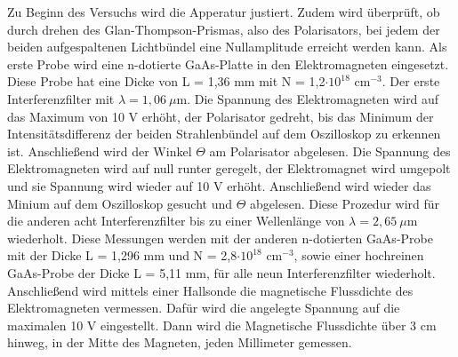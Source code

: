 Zu Beginn des Versuchs wird die Apperatur justiert. Zudem wird überprüft, ob durch drehen des Glan-Thompson-Prismas, 
also des Polarisators, bei jedem der beiden aufgespaltenen Lichtbündel eine Nullamplitude erreicht werden kann. 
Als erste Probe wird eine n-dotierte GaAs-Platte in den Elektromagneten eingesetzt. 
Diese Probe hat eine Dicke von L = 1,36 mm mit N = 1,2$\cdot 10^{18}$ cm$^{-3}$. Der erste Interferenzfilter 
mit $\lambda = 1,06 \: \mu$m. Die Spannung des Elektromagneten wird auf das Maximum von 10 V erhöht, 
der Polarisator gedreht, bis das Minimum der Intensitätsdifferenz der beiden Strahlenbündel auf dem Oszilloskop 
zu erkennen ist. Anschließend wird der Winkel $\Theta$ am Polarisator abgelesen.
Die Spannung des Elektromagneten wird auf null runter geregelt, der Elektromagnet wird umgepolt 
und sie Spannung wird wieder auf 10 V erhöht. Anschließend wird wieder das Minium auf dem Oszilloskop gesucht und 
$\Theta$ abgelesen. Diese Prozedur wird für die anderen acht Interferenzfilter bis zu einer Wellenlänge 
von $\lambda = 2,65 \: \mu$m wiederholt.
Diese Messungen werden mit der anderen n-dotierten GaAs-Probe mit der Dicke L = 1,296 mm und N = 2,8$\cdot 10^{18}$ cm$^{-3}$, 
sowie einer hochreinen GaAs-Probe der Dicke L = 5,11 mm, für alle neun Interferenzfilter wiederholt.
Anschließend wird mittels einer Hallsonde die magnetische Flussdichte des Elektromagneten vermessen. 
Dafür wird die angelegte Spannung auf die maximalen 10 V eingestellt. 
Dann wird die Magnetische Flussdichte über 3 cm hinweg, in der Mitte des Magneten, jeden Millimeter gemessen.

